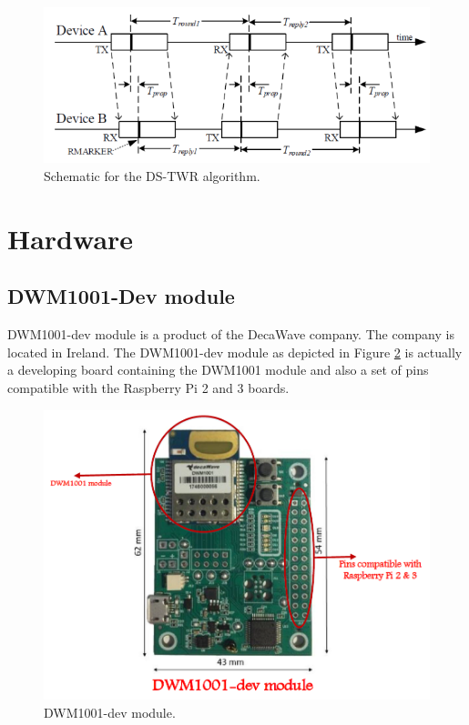 \documentclass{article}
\begin{document}
\begin{figure}[thpb]
\centering
\includegraphics[scale=0.65]{Pics/DS_TWR.PNG}
\caption{Schematic for the DS-TWR algorithm.}
\label{Fig_03}
\end{figure}

\newpage
\section{Hardware}

\subsection{DWM1001-Dev module}
DWM1001-dev module is a product of the DecaWave company. The company is located in Ireland. The DWM1001-dev module as depicted in Figure \ref{Fig_04} is actually a developing board containing the DWM1001 module and also a set of pins compatible with the Raspberry Pi 2 and 3 boards. 

\begin{figure}[thpb]
\centering
\includegraphics[scale=0.4]{Pics/DWM1001DEV01.PNG}
\caption{DWM1001-dev module.}
\label{Fig_04}
\end{figure}
\end{document}
